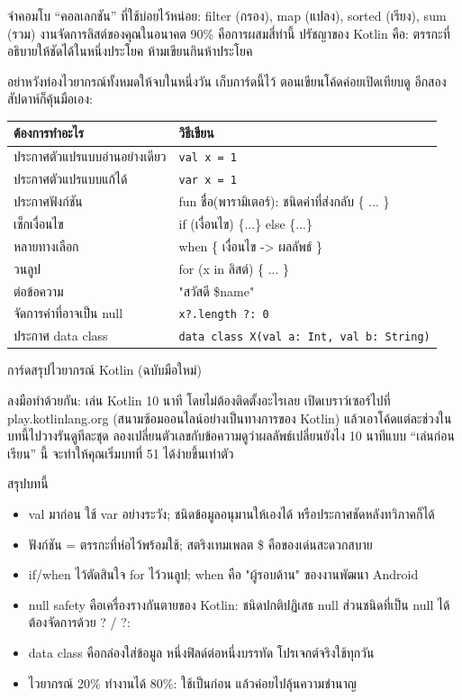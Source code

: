 จำคอมโบ “คอลเลกชัน” ที่ใช้บ่อยไว้หน่อย: filter (กรอง), map (แปลง), sorted (เรียง), sum (รวม) งานจัดการลิสต์ของคุณในอนาคต 90\% คือการผสมสี่ท่านี้ ปรัชญาของ Kotlin คือ: ตรรกะที่อธิบายให้ชัดได้ในหนึ่งประโยค ห้ามเขียนกินห้าประโยค


อย่าหวังท่องไวยากรณ์ทั้งหมดให้จบในหนึ่งวัน เก็บการ์ดนี้ไว้ ตอนเขียนโค้ดค่อยเปิดเทียบดู อีกสองสัปดาห์ก็คุ้นมือเอง:

\begin{center}
\begin{tabularx}{\linewidth}{|X|X|}
\hline
\textbf{ต้องการทำอะไร} & \textbf{วิธีเขียน} \tabularnewline
\hline
ประกาศตัวแปรแบบอ่านอย่างเดียว & \texttt{val x = 1} \tabularnewline
ประกาศตัวแปรแบบแก้ได้ & \texttt{var x = 1} \tabularnewline
ประกาศฟังก์ชัน & fun ชื่อ(พารามิเตอร์): ชนิดค่าที่ส่งกลับ \{ ... \} \tabularnewline
เช็กเงื่อนไข & if (เงื่อนไข) \{...\} else \{...\} \tabularnewline
หลายทางเลือก & when \{ เงื่อนไข -> ผลลัพธ์ \} \tabularnewline
วนลูป & for (x in ลิสต์) \{ ... \} \tabularnewline
ต่อข้อความ & "สวัสดี \$name" \tabularnewline
จัดการค่าที่อาจเป็น null & \texttt{x?.\allowbreak length ?: 0} \tabularnewline
ประกาศ data class & \texttt{data class X(val a: Int, val b: String)} \tabularnewline
\hline
\end{tabularx}
\end{center}

\begin{center}\small\color{gray}การ์ดสรุปไวยากรณ์ Kotlin (ฉบับมือใหม่)\end{center}

\begin{tcbpractice}{ลงมือทำด้วยกัน: เล่น Kotlin 10 นาที โดยไม่ต้องติดตั้งอะไรเลย}
เปิดเบราว์เซอร์ไปที่ play.kotlinlang.org (สนามซ้อมออนไลน์อย่างเป็นทางการของ Kotlin) แล้วเอาโค้ดแต่ละช่วงในบทนี้ไปวางรันดูทีละชุด ลองเปลี่ยนตัวเลขกับข้อความดูว่าผลลัพธ์เปลี่ยนยังไง 10 นาทีแบบ “เล่นก่อนเรียน” นี้ จะทำให้คุณเริ่มบทที่ 51 ได้ง่ายขึ้นเท่าตัว

\end{tcbpractice}

\begin{tcbsummary}{สรุปบทนี้}
\begin{itemize}
  \item val มาก่อน ใช้ var อย่างระวัง; ชนิดข้อมูลอนุมานให้เองได้ หรือประกาศชัดหลังทวิภาคก็ได้
  \item ฟังก์ชัน = ตรรกะที่ห่อไว้พร้อมใช้; สตริงเทมเพลต \$ คือของเด่นสะดวกสบาย
  \item if/when ไว้ตัดสินใจ for ไว้วนลูป; when คือ "ผู้รอบด้าน" ของงานพัฒนา Android
  \item null safety คือเครื่องรางกันตายของ Kotlin: ชนิดปกติปฏิเสธ null ส่วนชนิดที่เป็น null ได้ต้องจัดการด้วย ? / ?:
  \item data class คือกล่องใส่ข้อมูล หนึ่งฟิลด์ต่อหนึ่งบรรทัด โปรเจกต์จริงใช้ทุกวัน
  \item ไวยากรณ์ 20\% ทำงานได้ 80\%: ใช้เป็นก่อน แล้วค่อยไปลุ้นความชำนาญ
\end{itemize}

\end{tcbsummary}
